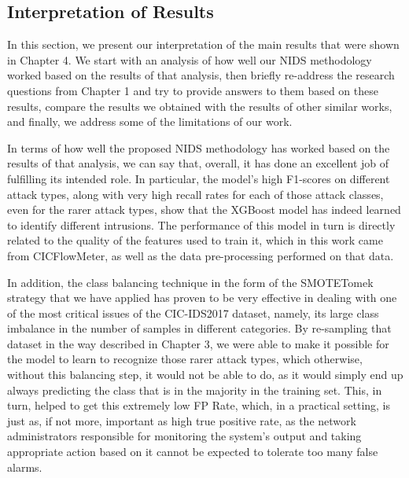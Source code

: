 \subsection{Interpretation of Results} 

In this section, we present our interpretation of the main results that were shown in Chapter 4. We start with an analysis of how well our NIDS methodology worked based on the results of that analysis, then briefly re-address the research questions from Chapter 1 and try to provide answers to them based on these results, compare the results we obtained with the results of other similar works, and finally, we address some of the limitations of our work.

In terms of how well the proposed NIDS methodology has worked based on the results of that analysis, we can say that, overall, it has done an excellent job of fulfilling its intended role. In particular, the model’s high F1-scores on different attack types, along with very high recall rates for each of those attack classes, even for the rarer attack types, show that the XGBoost model has indeed learned to identify different intrusions. The performance of this model in turn is directly related to the quality of the features used to train it, which in this work came from CICFlowMeter, as well as the data pre-processing performed on that data.

In addition, the class balancing technique in the form of the SMOTETomek strategy that we have applied has proven to be very effective in dealing with one of the most critical issues of the CIC-IDS2017 dataset, namely, its large class imbalance in the number of samples in different categories. By re-sampling that dataset in the way described in Chapter 3, we were able to make it possible for the model to learn to recognize those rarer attack types, which otherwise, without this balancing step, it would not be able to do, as it would simply end up always predicting the class that is in the majority in the training set. This, in turn, helped to get this extremely low FP Rate, which, in a practical setting, is just as, if not more, important as high true positive rate, as the network administrators responsible for monitoring the system’s output and taking appropriate action based on it cannot be expected to tolerate too many false alarms.

